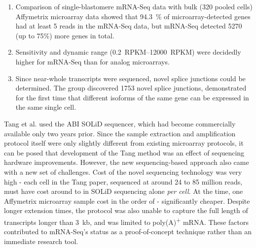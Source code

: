 \begin{enumerate}[noitemsep]
	\item Comparison of single-blastomere mRNA-Seq data with bulk (320 pooled cells) Affymetrix microarray data showed that \SI{94.3}{\percent} of microarray-detected genes had at least 5 reads in the mRNA-Seq data, but mRNA-Seq detected \num{5270} (up to 75\%) more genes in total.
	\item Sensitivity and dynamic range (\SIrange{0.2}{12000}{RPKM}) were decidedly higher for mRNA-Seq than for analog microarrays.
	\item Since near-whole transcripts were sequenced, novel splice junctions could be determined. The group discovered \num{1753} novel splice junctions, demonstrated for the first time that different isoforms of the same gene can be expressed in the same single cell.
\end{enumerate}

Tang et al. used the ABI SOLiD sequencer, which had become commercially available only two years prior. Since the sample extraction and amplification protocol itself were only slightly different from existing microarray protocols, it can be posed that development of the Tang method was an effect of sequencing hardware improvements. However, the new sequencing-based approach also came with a new set of challenges. Cost of the novel sequencing technology was very high - each cell in the Tang paper, sequenced at around 24 to 85 million reads, must have cost around  to  in SOLiD sequencing alone \textit{per cell}. At the time, one Affymetrix microarray sample cost in the order of  - significantly cheaper. Despite longer extension times, the protocol was also unable to capture the full length of transcripts longer than \SI{3}{kb}, and was limited to poly(A)\textsuperscript{+} mRNA. These factors contributed to mRNA-Seq's status as a proof-of-concept technique rather than an immediate research tool.

